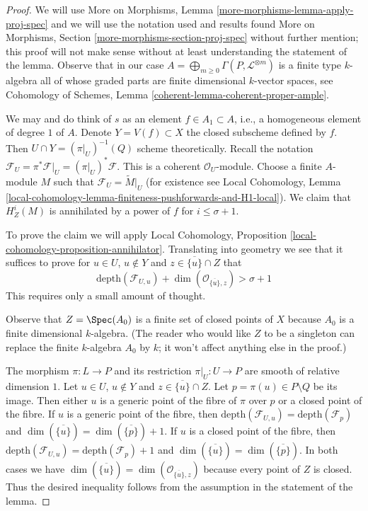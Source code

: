 \begin{proof}

We will use More on Morphisms, Lemma \ref{more-morphisms-lemma-apply-proj-spec}
and we will use the notation used and results found
More on Morphisms, Section \ref{more-morphisms-section-proj-spec}
without further mention; this proof will not make sense without
at least understanding the statement of the lemma.
Observe that in our case
$A = \bigoplus_{m \geq 0} \Gamma(P, \mathcal{L}^{\otimes m})$
is a finite type $k$-algebra
all of whose graded parts are finite dimensional $k$-vector spaces, see
Cohomology of Schemes, Lemma \ref{coherent-lemma-coherent-proper-ample}.

\medskip\noindent
We may and do think of $s$ as an element $f \in A_1 \subset A$, i.e.,
a homogeneous element of degree $1$ of $A$. Denote
$Y = V(f) \subset X$ the closed subscheme defined by $f$.
Then $U \cap Y = (\pi|_U)^{-1}(Q)$ scheme theoretically.
Recall the notation
$\mathcal{F}_U = \pi^*\mathcal{F}|_U = (\pi|_U)^*\mathcal{F}$.
This is a coherent $\mathcal{O}_U$-module.
Choose a finite $A$-module $M$ such that
$\mathcal{F}_U = \widetilde{M}|_U$
(for existence see Local Cohomology, Lemma
\ref{local-cohomology-lemma-finiteness-pushforwards-and-H1-local}).
We claim that $H^i_Z(M)$ is annihilated by
a power of $f$ for $i \leq \sigma + 1$.

\medskip\noindent
To prove the claim we will apply
Local Cohomology, Proposition \ref{local-cohomology-proposition-annihilator}.
Translating into geometry we see that it suffices to prove
for $u \in U$, $u \not \in Y$ and $z \in \overline{\{u\}} \cap Z$
that
$$
\text{depth}(\mathcal{F}_{U, u}) +
\dim(\mathcal{O}_{\overline{\{u\}}, z}) > \sigma + 1
$$
This requires only a small amount of thought.

\medskip\noindent
Observe that $Z = \Spec(A_0)$ is a finite set of closed points of $X$ because
$A_0$ is a finite dimensional $k$-algebra.
(The reader who would like $Z$ to be a singleton can replace the
finite $k$-algebra $A_0$ by $k$; it won't affect anything else in the proof.)

\medskip\noindent
The morphism $\pi : L \to P$ and its restriction $\pi|_U : U \to P$
are smooth of relative dimension $1$.
Let $u \in U$, $u \not \in Y$ and $z \in \overline{\{u\}} \cap Z$.
Let $p = \pi(u) \in P \setminus Q$ be its image.
Then either $u$ is a generic
point of the fibre of $\pi$ over $p$ or a closed point of the fibre.
If $u$ is a generic point of the fibre, then
$\text{depth}(\mathcal{F}_{U, u}) = \text{depth}(\mathcal{F}_p)$
and
$\dim(\overline{\{u\}}) = \dim(\overline{\{p\}}) + 1$.
If $u$ is a closed point of the fibre, then
$\text{depth}(\mathcal{F}_{U, u}) = \text{depth}(\mathcal{F}_p) + 1$
and
$\dim(\overline{\{u\}}) = \dim(\overline{\{p\}})$.
In both cases we have
$\dim(\overline{\{u\}}) = \dim(\mathcal{O}_{\overline{\{u\}}, z})$
because every point of $Z$ is closed. Thus the desired
inequality follows from the assumption in the statement of
the lemma.


\end{proof}
